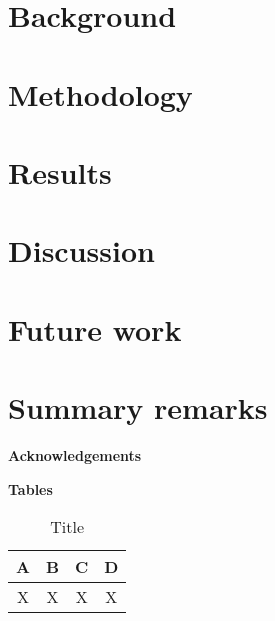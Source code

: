 \documentclass[11pt,a4paper]{article}
\begin{document}
\newpage

\section{Background} \label{background}

\newpage

\section{Methodology} \label{methodology}

\newpage

\section{Results} \label{results}

\newpage

\section{Discussion} \label{discussion}

\newpage

\section{Future work} \label{future-work}

\newpage

\section{Summary remarks} \label{summary-remarks}

\newpage 

\noindent\textbf{\Large{Acknowledgements}} \\

\newpage


\setlength{\bibhang}{0pt}


\newpage

\noindent\textbf{\Large{Tables}}

\begin{table}[h!]
    \centering
    \caption{Title}
        \begin{tabular}{|c|c|c|c|}
            \hline
            A&
            B&
            C&
            D\\
            \hline
            X&X&X&X\\
            \hline
        \end{tabular}
    \label{tab-density}
\end{table}
\end{document}
